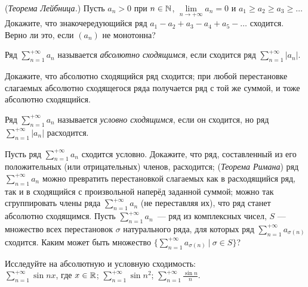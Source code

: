 \documentclass[a4paper, 12pt]{article}
\begin{document}


\noindent


({\em Теорема Лейбница.})
Пусть $a_n>0$ при $n\in\mathbb{N}$, $\lim\limits_{n\to{+\infty}}a_n=0$ и $a_1\geqslant a_2\geqslant
a_3\geqslant\dots$
Докажите, что знакочередующийся ряд $a_1-a_2+a_3-a_4+a_5-\dots$ сходится.\\
Верно ли это, если $(a_n)$ не монотонна?

Ряд $\sum\limits_{n=1}^{+\infty} a_n$ называется
{\em абсолютно сходящимся}, если сходится ряд
$\sum\limits_{n=1}^{+\infty}|a_n|$.

Докажите, что  абсолютно сходящийся ряд сходится;
 при любой перестановке слагаемых абсолютно сходящегося ряда получается  ряд с той же суммой, и тоже абсолютно сходящийся.


Ряд $\sum\limits_{n=1}^{+\infty} a_n$ называется
{\em условно сходящимся}, если он сходится,
но ряд $\sum\limits_{n=1}^{+\infty}|a_n|$ расходится.

Пусть ряд $\sum\limits_{n=1}^{+\infty} a_n$ сходится условно. Докажите, что
ряд, составленный из его положительных
(или отрицательных) членов, расходится;
({\em Теорема Римана})
ряд $\sum\limits_{n=1}^{+\infty} a_n$ можно превратить
перестановкой слагаемых как в расходящийся ряд, так и в сходящийся
с произвольной наперёд заданной суммой;
можно так сгруппировать члены ряда
$\sum\limits_{n=1}^{+\infty} a_n$ (не переставляя их),
что ряд станет абсолютно сходящимся.
Пусть $\sum\limits_{n=1}^{+\infty} a_n$~--- ряд из комплексных чисел,  $S$ --- множество всех перестановок $\sigma$
натурального ряда, для которых ряд $\sum\limits_{n=1}^{+\infty} a_{\sigma(n)}$
сходится. Каким может быть множество
$\big\{\sum\limits_{n=1}^{+\infty} a_{\sigma(n)}\ |\ \sigma\in S\big\}$?

Исследуйте на абсолютную и условную сходимость:\\
$\sum\limits_{n=1}^{+\infty} \sin nx$, где $x\in\mathbb{R}$;
$\sum\limits_{n=1}^{+\infty} \sin n^2$;
$\sum\limits_{n=1}^{+\infty}\frac{\sin n}{n}$.
\end{document}
